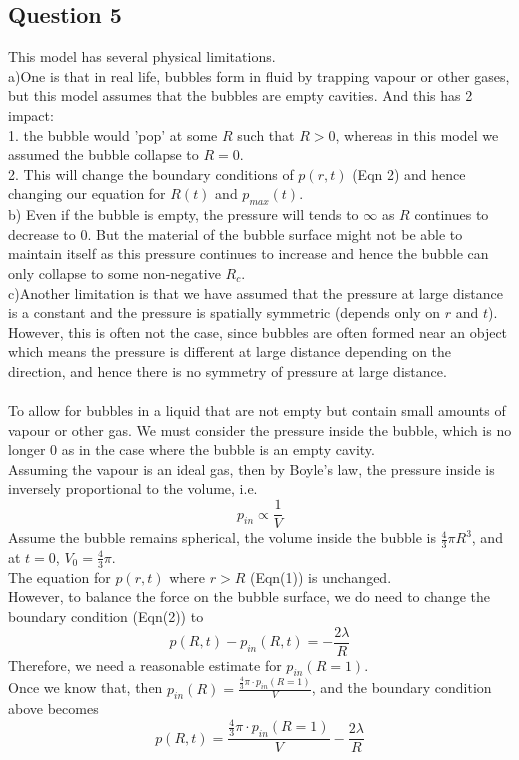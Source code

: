 \documentclass[10pt]{article}
\begin{document}
\subsection*{Question 5}
This model has several physical limitations. \\
a)\quad One is that in real life, bubbles form in fluid by trapping vapour or other gases, but this model assumes that the bubbles are empty cavities. And this has 2 impact:\\
1. the bubble would 'pop' at some $R$ such that $R>0$, whereas in this model we assumed the bubble collapse to $R=0$.\\
2. This will change the boundary conditions of $p(r,t)$ (Eqn 2) and hence changing our equation for $R(t)$ and $p_{max}(t)$.\vspace{0.3cm}\\
b) Even if the bubble is empty, the pressure will tends to $\infty$ as $R$ continues to decrease to 0. But the material of the bubble surface might not be able to maintain itself as this pressure continues to increase and hence the bubble can only collapse to some non-negative $R_c$.\vspace{0.2cm}\\
c)\quad Another limitation is that we have assumed that the pressure at large distance is a constant and the pressure is spatially symmetric (depends only on $r$ and $t$). However, this is often not the case, since bubbles are often formed near an object which means the pressure is different at large distance depending on the direction, and hence there is no symmetry of pressure at large distance.\\\\
To allow for bubbles in a liquid that are not empty but contain small amounts of vapour or other gas. We must consider the pressure inside the bubble, which is no longer 0 as in the case where the bubble is an empty cavity.\\
Assuming the vapour is an ideal gas, then by Boyle's law, the pressure inside is inversely proportional to the volume, i.e. \[p_{in}\propto\frac{1}{V}\]
Assume the bubble remains spherical, the volume inside the bubble is $\frac{4}{3}\pi R^3$, and at $t=0$, $V_0=\frac{4}{3}\pi$. \\
The equation for $p(r,t)$ where $r>R$ (Eqn(1)) is unchanged. \\
However, to balance the force on the bubble surface, we do need to change the boundary condition (Eqn(2)) to 
\[p(R,t)-p_{in}(R,t)=-\frac{2\lambda}{R}\]
Therefore, we need a reasonable estimate for $p_{in}(R=1)$.\\
Once we know that, then $p_{in}(R)=\frac{\frac{4}{3}\pi\cdot p_{in}(R=1) }{V}$, and the boundary condition above becomes
\[p(R,t)=\frac{\frac{4}{3}\pi\cdot p_{in}(R=1) }{V}-\frac{2\lambda}{R}\]
\end{document}
